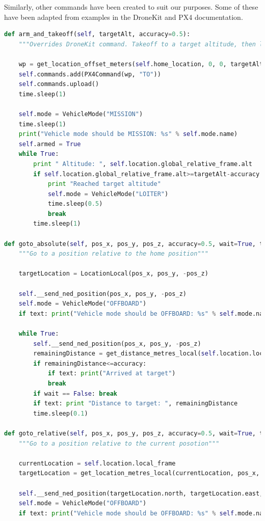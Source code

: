 \documentclass[11pt]{article}
\begin{document}
Similarly, other commands have been created to suit our purposes. Some of these have been adapted from examples in the DroneKit and PX4 documentation.\cite{PX4_dev_guide}\cite{dronekit}

\begin{lstlisting}[language=Python]
def arm_and_takeoff(self, targetAlt, accuracy=0.5):
    """Overrides DroneKit command. Takeoff to a target altitude, then loiter."""

    wp = get_location_offset_meters(self.home_location, 0, 0, targetAlt)
    self.commands.add(PX4Command(wp, "TO"))
    self.commands.upload()
    time.sleep(1)

    self.mode = VehicleMode("MISSION")
    time.sleep(1)
    print("Vehicle mode should be MISSION: %s" % self.mode.name)
    self.armed = True
    while True:
        print " Altitude: ", self.location.global_relative_frame.alt
        if self.location.global_relative_frame.alt>=targetAlt-accuracy:
            print "Reached target altitude"
            self.mode = VehicleMode("LOITER")
            time.sleep(0.5)
            break
        time.sleep(1)

def goto_absolute(self, pos_x, pos_y, pos_z, accuracy=0.5, wait=True, text=True):
    """Go to a position relative to the home position"""

    targetLocation = LocationLocal(pos_x, pos_y, -pos_z)

    self.__send_ned_position(pos_x, pos_y, -pos_z)
    self.mode = VehicleMode("OFFBOARD")
    if text: print("Vehicle mode should be OFFBOARD: %s" % self.mode.name)

    while True:
        self.__send_ned_position(pos_x, pos_y, -pos_z)
        remainingDistance = get_distance_metres_local(self.location.local_frame, targetLocation)
        if remainingDistance<=accuracy:
            if text: print("Arrived at target")
            break
        if wait == False: break
        if text: print "Distance to target: ", remainingDistance
        time.sleep(0.1)

def goto_relative(self, pos_x, pos_y, pos_z, accuracy=0.5, wait=True, text=True):
    """Go to a position relative to the current posotion"""

    currentLocation = self.location.local_frame
    targetLocation = get_location_metres_local(currentLocation, pos_x, pos_y, -pos_z)\

    self.__send_ned_position(targetLocation.north, targetLocation.east, targetLocation.down)
    self.mode = VehicleMode("OFFBOARD")
    if text: print("Vehicle mode should be OFFBOARD: %s" % self.mode.name)


\end{lstlisting}
\end{document}
